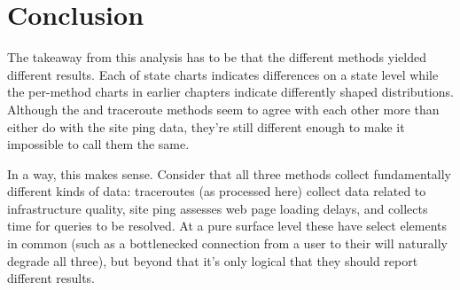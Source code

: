 \section{Conclusion}\label{sec:comparative-summary}

The takeaway from this analysis has to be that the different methods yielded different results. Each of state \kde charts indicates differences on a state level while the per-method \kde charts in earlier chapters indicate differently shaped distributions. Although the \dns and traceroute methods seem to agree with each other more than either do with the site ping data, they're still different enough to make it impossible to call them the same.

In a way, this makes sense. Consider that all three methods collect fundamentally different kinds of data: traceroutes (as processed here) collect data related to infrastructure quality, site ping assesses web page loading delays, and \dns collects time for \dns queries to be resolved. At a pure surface level these have select elements in common (such as a bottlenecked connection from a user to their \isp will naturally degrade all three), but beyond that it's only logical that they should report different results.
